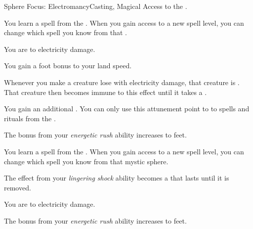     \begin{feat}{Sphere Focus: Electromancy}{Casting, Magical}
        \featpre Access to the  .

         You learn a spell from the  .
        When you gain access to a new spell level, you can change which spell you know from that .

         You are  to electricity damage.

         You gain a  foot bonus to your land speed.

         Whenever you make a creature lose  with electricity damage, that creature is  \dazed.
        That creature then becomes immune to this effect until it takes a .

         You gain an additional .
        You can only use this attunement point to  to spells and rituals from the  .

         The bonus from your \textit{energetic rush} ability increases to  feet.

         You learn a spell from the  .
        When you gain access to a new spell level, you can change which spell you know from that mystic sphere.

         The \dazed effect from your \textit{lingering shock} ability becomes a  that lasts until it is removed.

         You are  to electricity damage.

         The bonus from your \textit{energetic rush} ability increases to  feet.
    \end{feat}

